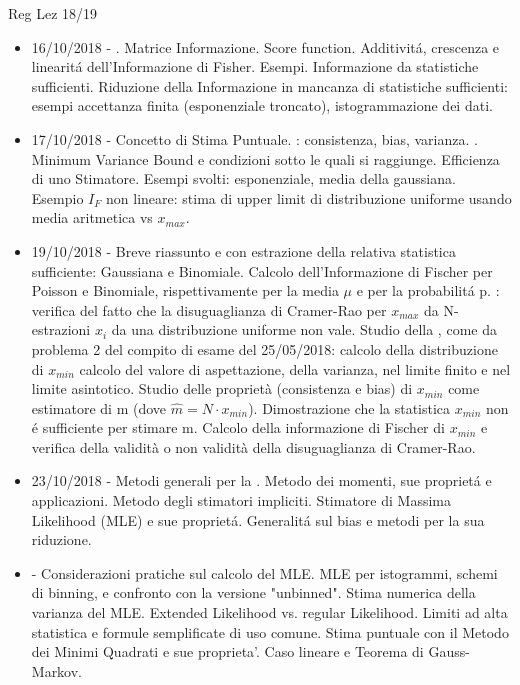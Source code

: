 \begin{frame}[allowframebreaks]{Reg Lez 18/19}
\begin{itemize}
    \item 16/10/2018 - . Matrice Informazione. Score function. Additivit\'a, crescenza e linearit\'a dell'Informazione di Fisher. Esempi. Informazione da statistiche sufficienti. Riduzione della Informazione in mancanza di statistiche sufficienti: esempi accettanza finita (esponenziale troncato), istogrammazione dei dati.
    
    \item 17/10/2018 - Concetto di Stima Puntuale. : consistenza, bias, varianza. . Minimum Variance Bound e condizioni sotto le quali si raggiunge. Efficienza di uno Stimatore. Esempi svolti: esponenziale, media della gaussiana. Esempio $I_F$ non lineare: stima di upper limit di distribuzione uniforme usando media aritmetica vs $x_{max}$.
    
    \item 19/10/2018 - Breve riassunto e  con estrazione della relativa statistica sufficiente: Gaussiana e Binomiale. Calcolo dell'Informazione di Fischer per Poisson e Binomiale, rispettivamente per la media $\mu$ e per la probabilit\'a p. : verifica del fatto che la disuguaglianza di Cramer-Rao per $x_{max}$ da N-estrazioni $x_i$ da una distribuzione uniforme non vale. Studio della , come da problema 2 del compito di esame del 25/05/2018: calcolo della distribuzione di $x_{min}$ calcolo del valore di aspettazione, della varianza, nel limite finito e nel limite asintotico. Studio delle proprietà (consistenza e bias) di $x_{min}$ come estimatore di m (dove $\hat{m} = N \cdot x_{min}$). Dimostrazione che la statistica $x_{min}$ non \'e sufficiente per stimare m. Calcolo della informazione di Fischer di $x_{min}$ e verifica della validità o non validità della disuguaglianza di Cramer-Rao.
    
    \item 23/10/2018 - Metodi generali per la . Metodo dei momenti, sue propriet\'a e applicazioni. Metodo degli stimatori impliciti. Stimatore di Massima Likelihood (MLE) e sue propriet\'a. Generalit\'a sul bias e metodi per la sua riduzione.
    
    \item {} - Considerazioni pratiche sul calcolo del MLE. MLE per istogrammi, schemi di binning, e confronto con la versione "unbinned". Stima numerica della varianza del MLE. Extended Likelihood vs. regular Likelihood. Limiti ad alta statistica e formule semplificate di uso comune. Stima puntuale con il Metodo dei Minimi Quadrati e sue proprieta'. Caso lineare e Teorema di Gauss-Markov.
    

\end{itemize}
\end{frame}
